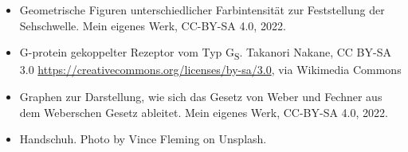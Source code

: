\documentclass{beamer}
\begin{document}
\begin{frame}
\begin{tiny}
\begin{itemize}
  \item
  Geometrische Figuren unterschiedlicher Farbintensität zur Feststellung der Sehschwelle. Mein eigenes Werk, CC-BY-SA 4.0, 2022.
  
  \item
  G-protein gekoppelter Rezeptor vom Typ G\textsubscript{S}. Takanori Nakane, CC BY-SA 3.0 \url{https://creativecommons.org/licenses/by-sa/3.0}, via Wikimedia Commons
 
 \item
 Graphen zur Darstellung, wie sich das Gesetz von Weber und Fechner aus dem Weberschen Gesetz ableitet. Mein eigenes Werk, CC-BY-SA 4.0, 2022. 
 
\item
Handschuh. Photo by Vince Fleming on Unsplash. 
  \end{itemize}
\end{tiny}
\end{frame}
\end{document}
